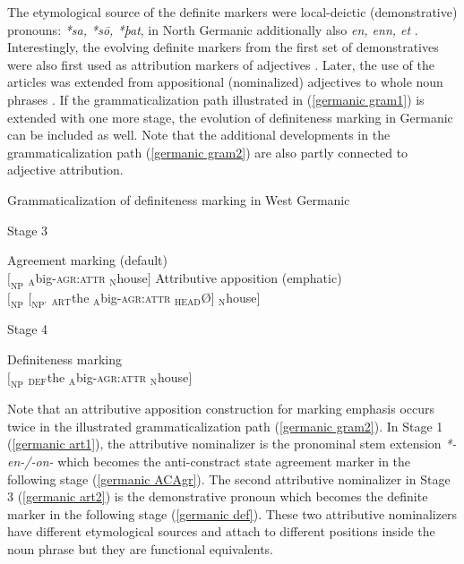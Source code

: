 {The etymological source of the definite markers were local-deictic (demonstrative) pronouns:  \textit{*sa, *sō, *þat}, in North Germanic additionally also \textit{en, enn, et} \citep[15]{heinrichs1954}. Interestingly, the evolving definite markers from the first set of  demonstratives were also first used as attribution markers of adjectives \citep{gamillscheg1937, nocentini1996}. Later, the use of the articles was extended from appositional (nominalized) adjectives to whole noun phrases \citep[63]{philippi1997}. If the grammaticalization path illustrated in (\ref{germanic gram1}) is extended with one more stage, the evolution of definiteness marking in Germanic can be included as well. Note that the additional developments in the grammaticalization path (\ref{germanic gram2}) are also partly connected to adjective attribution.
\begin{exe}
\label{germanic gram2}
\ex \rm{Grammaticalization of definiteness marking in West Germanic}
\begin{xlist}
\ex \rm{Stage 3}
\begin{xlist}
\ex \rm{Agreement marking (default)}\\
$[_{\text{NP}}$ $_{\text{A}}$big-\textsc{agr:attr} $_{\text{N}}$house$]$
\ex \rm{Attributive apposition (emphatic)}\\
\label{germanic art2}
$[_{\text{NP}}$ $[_{\text{NP'}}$ $_{\text{ART}}$the $_{\text{A}}$big-\textsc{agr:attr} $_{\text{HEAD}}$Ø$]$ $_{\text{N}}$house$]$
\end{xlist}
\ex \rm{Stage 4}
\begin{xlist}
\ex \rm{Definiteness marking}\\
$[_{\text{NP}}$ $_{\text{DEF}}$the $_{\text{A}}$big-\textsc{agr:attr} $_{\text{N}}$house$]$\label{germanic def}
\end{xlist}
\end{xlist}
\end{exe}
Note that an attributive apposition construction for marking emphasis occurs twice in the illustrated grammaticalization path (\ref{germanic gram2}). In Stage 1 (\ref{germanic art1}), the attributive nominalizer is the pronominal stem extension \textit{*-en-/-on-} which becomes the anti-constract state agreement marker in the following stage (\ref{germanic ACAgr}). The second attributive nominalizer in Stage 3 (\ref{germanic art2}) is the demonstrative pronoun which becomes the definite marker in the following stage (\ref{germanic def}). These two attributive nominalizers have different etymological sources and attach to different positions inside the noun phrase but they are functional equivalents.

}
